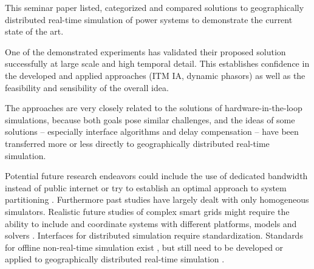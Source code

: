 \documentclass[a4paper,ngerman]{atseminar}
\begin{document}

This seminar paper listed, categorized and compared solutions to geographically distributed real-time simulation of power systems to demonstrate the current state of the art.

One of the demonstrated experiments has validated their proposed solution successfully at large scale and high temporal detail. This establishes confidence in the developed and applied approaches (ITM IA, dynamic phasors) as well as the feasibility and sensibility of the overall idea.

The approaches are very closely related to the solutions of hardware-in-the-loop simulations, because both goals pose similar challenges, and the ideas of some solutions -- especially interface algorithms and delay compensation -- have been transferred more or less directly to geographically distributed real-time simulation.

Potential future research endeavors could include the use of dedicated bandwidth instead of public internet or try to establish an optimal approach to system partitioning \cite{montoya2020}. Furthermore past studies have largely dealt with only homogeneous simulators. Realistic future studies of complex smart grids might require the ability to include and coordinate systems with different platforms, models and solvers \cite{syed2020standard, palensky2017}. Interfaces for distributed simulation
require standardization. Standards for offline non-real-time simulation exist \cite{dcp}, but still need to be developed or applied to geographically distributed real-time simulation \cite{syed2020standard}.





\end{document}
